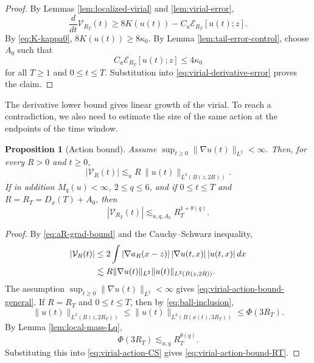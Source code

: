 \documentclass[smallextended,envcountsect,nospthms]{svjour3}
\numberwithin{equation}{section}
\theoremstyle{spbreak}
\newtheorem{proposition}[theorem]{Proposition}
\theoremstyle{spdefbreak}
\theoremstyle{spdefbreak}
\newcommand{\Vc}{\mathcal V}
\begin{document}
\begin{proof}
By Lemmas \ref{lem:localized-virial} and \ref{lem:virial-error},
\begin{equation}\label{eq:virial-derivative-error}
  \frac{d}{dt}\Vc_{R_T}(t)
  \ge8K(u(t))-C_a\mathcal E_{R_T}[u(t);z].
\end{equation}
By \eqref{eq:K-kappa0}, $8K(u(t))\ge8\kappa_0$. By Lemma \ref{lem:tail-error-control}, choose $A_0$ such that
\begin{equation*}
  C_a\mathcal E_{R_T}[u(t);z]\le4\kappa_0
\end{equation*}
for all $T\ge1$ and $0\le t\le T$. Substitution into \eqref{eq:virial-derivative-error} proves the claim.
\end{proof}

The derivative lower bound gives linear growth of the virial. To reach a contradiction, we also need to estimate the size of the same action at the endpoints of the time window.

\begin{proposition}[Action bound]\label{prop:virial-action-upper}
Assume $\sup_{t\ge0}\|\nabla u(t)\|_{L^2}<\infty$. Then, for every $R>0$ and $t\ge0$,
\begin{equation}\label{eq:virial-action-bound-general}
  |\Vc_R(t)|
  \lesssim_u R\,\|u(t)\|_{L^2(B(z,2R))}.
\end{equation}
If in addition $M_q(u)<\infty$, $2\le q\le6$, and if $0\le t\le T$ and $R=R_T=D_x(T)+A_0$, then
\begin{equation}\label{eq:virial-action-bound-RT}
  |\Vc_{R_T}(t)|
  \lesssim_{u,q,A_0} R_T^{1+\theta(q)}.
\end{equation}
\end{proposition}

\begin{proof}
By \eqref{eq:aR-grad-bound} and the Cauchy--Schwarz inequality,
\begin{align}
  |\Vc_R(t)|
  &\le2\int |\nabla a_R(x-z)|\,|\nabla u(t,x)|\,|u(t,x)|\,dx\notag\\
  &\lesssim R\|\nabla u(t)\|_{L^2}\|u(t)\|_{L^2(B(z,2R))}.
  \label{eq:virial-action-CS}
\end{align}
The assumption $\sup_{t\ge0}\|\nabla u(t)\|_{L^2}<\infty$ gives \eqref{eq:virial-action-bound-general}.
If $R=R_T$ and $0\le t\le T$, then by \eqref{eq:ball-inclusion},
\begin{equation*}
  \|u(t)\|_{L^2(B(z,2R_T))}
  \le\|u(t)\|_{L^2(B(x(t),3R_T))}
  \le\Phi(3R_T).
\end{equation*}
By Lemma \ref{lem:local-mass-Lq},
\begin{equation*}
  \Phi(3R_T)\lesssim_{u,q} R_T^{\theta(q)}.
\end{equation*}
Substituting this into \eqref{eq:virial-action-CS} gives \eqref{eq:virial-action-bound-RT}.
\end{proof}
\end{document}

